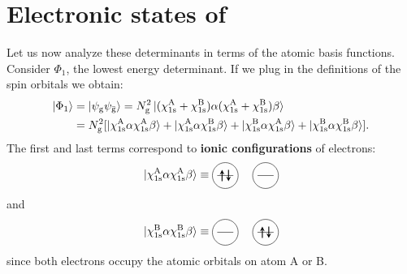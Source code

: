 \documentclass[../Main/chem532-notes.tex]{subfiles}
\begin{document}
\section{Electronic states of }
Let us now analyze these determinants in terms of the atomic basis functions.
Consider $\Phi_1$, the lowest energy determinant.
If we plug in the definitions of the spin orbitals we obtain:
\begin{equation}
\begin{split}
\ket{\Phi_1} &= \ket{\psi_{\mathrm{g}} \psi_{\bar{\mathrm{g}}}} = N_{\mathrm{g}}^2 \ket{ (\chi_{1\rm s}^{\rm A} + \chi_{1\rm s}^{\rm B}) \alpha  (\chi_{1\rm s}^{\rm A} + \chi_{1\rm s}^{\rm B}) \beta} \\
&= N_{\mathrm{g}}^2 [ \ket{\chi_{1\rm s}^{\rm A}\alpha \chi_{1\rm s}^{\rm A}\beta}
+ \ket{\chi_{1\rm s}^{\rm A}\alpha \chi_{1\rm s}^{\rm B}\beta}
+ \ket{\chi_{1\rm s}^{\rm B}\alpha \chi_{1\rm s}^{\rm A}\beta} 
+\ket{\chi_{1\rm s}^{\rm B}\alpha \chi_{1\rm s}^{\rm B}\beta}].
\end{split}
\end{equation}
The first and last terms correspond to \textbf{ionic configurations} of electrons: 
\begin{equation}
 \ket{\chi_{1\rm s}^{\rm A}\alpha \chi_{1\rm s}^{\rm A}\beta} \equiv 
 \begin{tikzpicture}[baseline={([yshift=-.5ex]current bounding box.center)},vertex/.style={anchor=base, minimum size=18pt, inner sep=2pt}]
    \draw (0.25,0.5) circle (0.4);
    \draw (0,0.5) -- (0.5,0.5);
    \draw[thick,->,>=stealth] (0.15,0.325) -- (0.15,0.675);
    \draw[thick,<-,>=stealth] (0.35,0.325) -- (0.35,0.675);    
    \draw (1.5,0.5) circle (0.4);
    \draw (1.25,0.5) -- (1.75,0.5);
  \end{tikzpicture}
\end{equation}
and
\begin{equation}
 \ket{\chi_{1\rm s}^{\rm B}\alpha \chi_{1\rm s}^{\rm B}\beta} \equiv 
 \begin{tikzpicture}[baseline={([yshift=-.5ex]current bounding box.center)},vertex/.style={anchor=base, minimum size=18pt, inner sep=2pt}]
    \draw (0.25,0.5) circle (0.4);
    \draw (0,0.5) -- (0.5,0.5);
    \draw[thick,->,>=stealth] (1.4,0.325) -- (1.4,0.675);
    \draw (1.5,0.5) circle (0.4);
    \draw (1.25,0.5) -- (1.75,0.5);
    \draw[thick,<-,>=stealth] (1.6,0.325) -- (1.6,0.675);
  \end{tikzpicture}
\end{equation}
since both electrons occupy the atomic orbitals on atom A or B.
\end{document}

